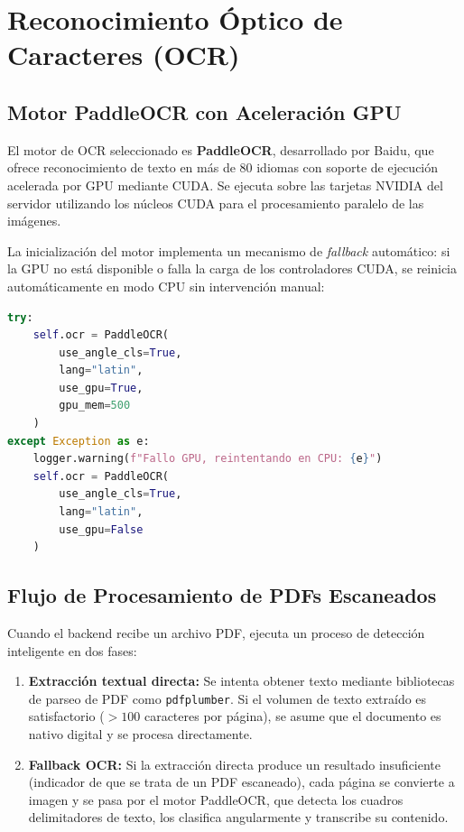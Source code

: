 \section{Reconocimiento Óptico de Caracteres (OCR)}

\subsection{Motor PaddleOCR con Aceleración GPU}
El motor de OCR seleccionado es \textbf{PaddleOCR}, desarrollado por Baidu, que ofrece reconocimiento de texto en más de 80 idiomas con soporte de ejecución acelerada por GPU mediante CUDA. Se ejecuta sobre las tarjetas NVIDIA del servidor utilizando los núcleos CUDA para el procesamiento paralelo de las imágenes.

La inicialización del motor implementa un mecanismo de \textit{fallback} automático: si la GPU no está disponible o falla la carga de los controladores CUDA, se reinicia automáticamente en modo CPU sin intervención manual:

\begin{lstlisting}[language=Python, caption={Inicialización de PaddleOCR con fallback CPU/GPU.}]
try:
    self.ocr = PaddleOCR(
        use_angle_cls=True,
        lang="latin",
        use_gpu=True,
        gpu_mem=500
    )
except Exception as e:
    logger.warning(f"Fallo GPU, reintentando en CPU: {e}")
    self.ocr = PaddleOCR(
        use_angle_cls=True,
        lang="latin",
        use_gpu=False
    )
\end{lstlisting}

\subsection{Flujo de Procesamiento de PDFs Escaneados}
Cuando el backend recibe un archivo PDF, ejecuta un proceso de detección inteligente en dos fases:
\begin{enumerate}
    \item \textbf{Extracción textual directa:} Se intenta obtener texto mediante bibliotecas de parseo de PDF como \texttt{pdfplumber}. Si el volumen de texto extraído es satisfactorio ($> 100$ caracteres por página), se asume que el documento es nativo digital y se procesa directamente.
    \item \textbf{Fallback OCR:} Si la extracción directa produce un resultado insuficiente (indicador de que se trata de un PDF escaneado), cada página se convierte a imagen y se pasa por el motor PaddleOCR, que detecta los cuadros delimitadores de texto, los clasifica angularmente y transcribe su contenido.
\end{enumerate}

